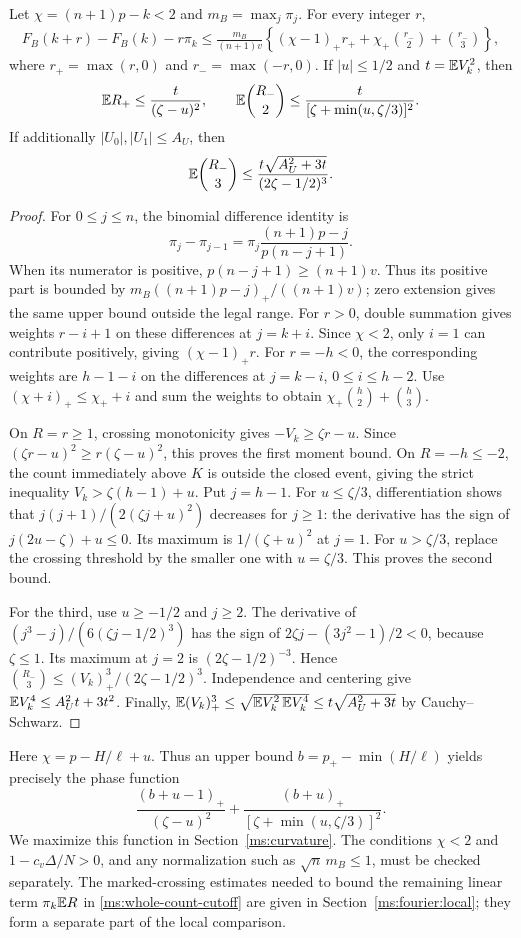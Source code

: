 \begin{lemma}
\label{ms:crossing-curvature}
Let $\chi=(n+1)p-k<2$ and $m_B=\max_j\pi_j$. For every integer $r$,
\begin{align}
 F_B(k+r)-F_B(k)-r\pi_k
 \le\frac{m_B}{(n+1)v}
 \left\{(\chi-1)_+r_++\chi_+\binom{r_-}{2}
                                      +\binom{r_-}{3}\right\},
\label{ms:discrete-curvature}
\end{align}
where $r_+=\max(r,0)$ and $r_-=\max(-r,0)$. If $|u|\le1/2$ and
$t=\mathbb E V_k^2$, then
\[
 \mathbb E R_+\le\frac{t}{(\zeta-u)^2},\qquad
 \mathbb E\binom{R_-}{2}\le\frac{t}{[\zeta+\min(u,\zeta/3)]^2}.
\]
If additionally $|U_0|,|U_1|\le A_U$, then
\[
 \mathbb E\binom{R_-}{3}\le
           \frac{t\sqrt{A_U^2+3t}}{(2\zeta-1/2)^3}.
\]
\end{lemma}
\begin{proof}
For $0\le j\le n$, the binomial difference identity is
\[
 \pi_j-\pi_{j-1}
    =\pi_j\frac{(n+1)p-j}{p(n-j+1)}.
\]
When its numerator is positive, $p(n-j+1)\ge(n+1)v$.
Thus its positive part is bounded by
$m_B((n+1)p-j)_+/((n+1)v)$; zero extension gives the same upper
bound outside the legal range. For $r>0$, double summation gives weights
$r-i+1$ on these differences at $j=k+i$. Since $\chi<2$, only $i=1$
can contribute positively, giving $(\chi-1)_+r$.
For $r=-h<0$, the corresponding weights are $h-1-i$ on the differences
at $j=k-i$, $0\le i\le h-2$. Use $(\chi+i)_+\le\chi_++i$ and
sum the weights to obtain $\chi_+\binom h2+\binom h3$.

On $R=r\ge1$, crossing monotonicity gives $-V_k\ge \zeta r-u$.
Since $(\zeta r-u)^2\ge r(\zeta-u)^2$, this proves the first moment bound.
On $R=-h\le-2$, the count immediately above $K$ is outside the closed
event, giving the strict inequality $V_k>\zeta(h-1)+u$. Put $j=h-1$.
For $u\le \zeta/3$, differentiation shows that
$j(j+1)/(2(\zeta j+u)^2)$ decreases for $j\ge1$: the derivative has the sign
of $j(2u-\zeta)+u\le0$. Its maximum is $1/(\zeta+u)^2$ at $j=1$.
For $u>\zeta/3$, replace the crossing threshold by the smaller one with
$u=\zeta/3$. This proves the second bound.

For the third, use $u\ge-1/2$ and $j\ge2$. The derivative of
$(j^3-j)/(6(\zeta j-1/2)^3)$ has the sign of
$2\zeta j-(3j^2-1)/2<0$, because $\zeta\le1$. Its maximum at $j=2$ is
$(2\zeta-1/2)^{-3}$. Hence
$\binom{R_-}{3}\le(V_k)_+^3/(2\zeta-1/2)^3$.
Independence and centering give
$\mathbb E V_k^4\le A_U^2t+3t^2$. Finally,
$\mathbb E(V_k)_+^3\le\sqrt{\mathbb E V_k^2\,\mathbb E V_k^4}
\le t\sqrt{A_U^2+3t}$ by Cauchy--Schwarz.
\end{proof}

Here $\chi=p-H/\ell+u$. Thus an upper bound
$b=p_+-\min(H/\ell)$ yields precisely the phase function
\[
 \frac{(b+u-1)_+}{(\zeta-u)^2}
 +\frac{(b+u)_+}{[\zeta+\min(u,\zeta/3)]^2}.
\]
We maximize this function in Section~\ref{ms:curvature}.
The conditions $\chi<2$ and $1-c_v\Delta/N>0$, and any normalization
such as $\sqrt n\,m_B\le1$, must be checked separately.
The marked-crossing estimates needed to bound the remaining linear term
$\pi_k\mathbb E R$ in \eqref{ms:whole-count-cutoff} are given in Section~\ref{ms:fourier:local}; they form a separate part
of the local comparison.
